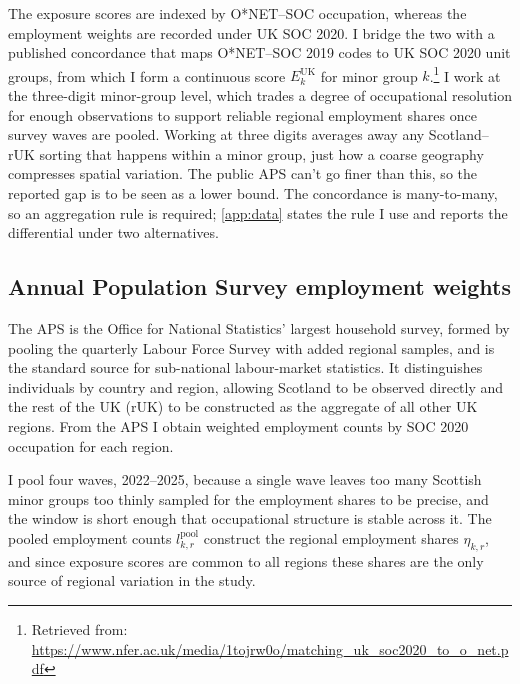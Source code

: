 The exposure scores are indexed by O*NET--SOC occupation, whereas the employment weights are recorded under UK SOC 2020. I bridge the two with a published concordance that maps O*NET--SOC 2019 codes to UK SOC 2020 unit groups, from which I form a continuous score $E^{\mathrm{UK}}_k$ for minor group $k$.\footnote{Retrieved from: \url{https://www.nfer.ac.uk/media/1tojrw0o/matching_uk_soc2020_to_o_net.pdf}} I work at the three-digit minor-group level, which trades a degree of occupational resolution for enough observations to support reliable regional employment shares once survey waves are pooled. Working at three digits averages away any Scotland--rUK sorting that happens within a minor group, just how a coarse geography compresses spatial variation. The public APS can't go finer than this, so the reported gap is to be seen as a lower bound.
The concordance is many-to-many, so an aggregation rule is required; \cref{app:data} states the rule I use and reports the differential under two alternatives.

\subsection{Annual Population Survey employment weights}\label{sec:aps}

The APS is the Office for National Statistics' largest household survey, formed by pooling the quarterly Labour Force Survey with added regional samples, and is the standard source for sub-national labour-market statistics. It distinguishes individuals by country and region, allowing Scotland to be observed directly and the rest of the UK (rUK) to be constructed as the aggregate of all other UK regions. From the APS I obtain weighted employment counts by SOC 2020 occupation for each region.

I pool four waves, 2022--2025, because a single wave leaves too many Scottish minor groups too thinly sampled for the employment shares to be precise, and the window is short enough that occupational structure is stable across it. The pooled employment counts $l^{\mathrm{pool}}_{k,r}$ construct the regional employment shares $\eta_{k,r}$, and since exposure scores are common to all regions these shares are the only source of regional variation in the study.

